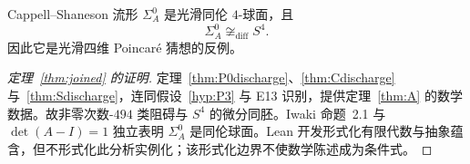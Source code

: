 \begin{theorem}[Trace-73 定理]\label{thm:joined}
Cappell--Shaneson 流形 $\Sigma_A^0$ 是光滑同伦 $4$-球面，且
\[
\Sigma_A^0\not\cong_{\mathrm{diff}}S^4.
\]
因此它是光滑四维 Poincaré 猜想的反例。
\end{theorem}

\begin{proof}[定理~\ref{thm:joined} 的证明]
定理~\ref{thm:P0discharge}、\ref{thm:Cdischarge} 与~\ref{thm:Sdischarge}，连同假设~\ref{hyp:P3} 与 E13 识别，提供定理~\ref{thm:A} 的数学数据。故非零次数-$494$ 类阻碍与 $S^4$ 的微分同胚。Iwaki 命题~2.1 与 $\det(A-I)=1$ 独立表明 $\Sigma_A^0$ 是同伦球面。Lean 开发形式化有限代数与抽象蕴含，但不形式化此分析实例化；该形式化边界不使数学陈述成为条件式。
\end{proof}


